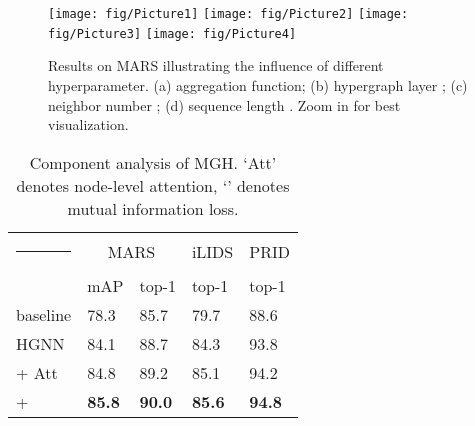 \documentclass[10pt,twocolumn,letterpaper]{article}
\makeatletter
\newcommand{\thickhline}{\noalign {\ifnum 0=`}\fi \hrule height 1pt
    \futurelet \reserved@a \@xhline
}
\makeatother
\begin{document}
\begin{figure*}
\setlength{\abovecaptionskip}{-0.1mm}
    \centering
    \texttt{[image: fig/Picture1]}
    \texttt{[image: fig/Picture2]}
    \texttt{[image: fig/Picture3]}
    \texttt{[image: fig/Picture4]}
    \caption{Results on MARS illustrating the influence of different hyperparameter. (a) aggregation function; (b) hypergraph layer ; (c) neighbor number ; (d) sequence length . Zoom in for best visualization.}
    \label{fig:sensi}
    \vspace{-2mm}
\end{figure*}


\begin{table}[t]
\setlength{\abovecaptionskip}{-0.01mm}
\centering
\begin{tabular}{p{1.7cm}|p{1.1cm}<{\centering}p{1.1cm}<{\centering}|p{1.1cm}<{\centering}|p{1.1cm}<{\centering}}
\hline\thickhline
\rowcolor{mygray} 
  & \multicolumn{2}{c|}{MARS} & \multicolumn{1}{c|}{iLIDS} & \multicolumn{1}{c}{PRID}  \\ \cline{2-5} 
\rowcolor{mygray} 
\multirow{-2}{*}{Methods}  & mAP & top-1  & top-1  & top-1  \\  \hline \hline     
baseline
  & 78.3    & 85.7  & 79.7  & 88.6   \\\hline
HGNN  & 84.1   & 88.7       & 84.3   & 93.8    \\ 
+ Att  & 84.8   & 89.2       & 85.1   & 94.2  \\
+   & \textbf{85.8}  & \textbf{90.0}       & \textbf{85.6} & \textbf{94.8} \\ \hline
\end{tabular}
\caption{Component analysis of MGH. `Att' denotes node-level attention, `' denotes mutual information loss.}
\label{tab:component}
\end{table}
\end{document}
